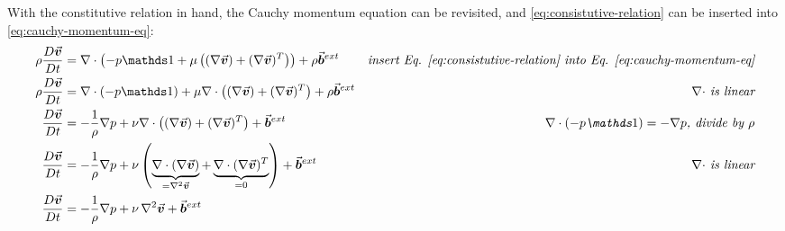 With the constitutive relation in hand, the Cauchy momentum equation can be revisited, and \autoref{eq:consistutive-relation} can be inserted into \autoref{eq:cauchy-momentum-eq}:
\begin{align}
    \label{eq:ns-deriv-step-1}\rho\frac{D\vek{v}}{Dt} & =  \nabla\cdot\left(-p\mat{1} + \mu\left((\nabla \vek{v}) + (\nabla \vek{v})^T\right)\right) + \rho\vek{b}^{ext}                                                         & \textit{insert Eq. \ref{eq:consistutive-relation} into Eq. \ref{eq:cauchy-momentum-eq}} \\
    \label{eq:ns-deriv-step-2}\rho\frac{D\vek{v}}{Dt} & = \nabla\cdot (-p\mat{1}) + \mu\nabla\cdot\left((\nabla \vek{v}) + (\nabla \vek{v})^T\right)+\rho\vek{b}^{ext}                                                           & \textit{$\nabla\cdot$ is linear}                                                        \\
    \label{eq:ns-deriv-step-3}\frac{D\vek{v}}{Dt}     & = -\frac{1}{\rho}\nabla p + \nu\nabla\cdot\left((\nabla \vek{v}) + (\nabla \vek{v})^T\right)+\vek{b}^{ext}                                                               & \textit{$\nabla\cdot (-p\mat{1}) = -\nabla p$, divide by $\rho$}                        \\
    \label{eq:ns-deriv-step-4}\frac{D\vek{v}}{Dt}     & = -\frac{1}{\rho}\nabla p + \nu\left(\underbrace{\nabla\cdot(\nabla \vek{v})}_{=\Laplace\vek{v}} + \underbrace{\nabla\cdot(\nabla \vek{v})^T}_{=0} \right)+\vek{b}^{ext} & \textit{$\nabla\cdot$ is linear}                                                        \\
    \label{eq:ns-deriv-step-5}\frac{D\vek{v}}{Dt}     & = -\frac{1}{\rho}\nabla p + \nu\Laplace\vek{v}+\vek{b}^{ext}                                                                                                             &
\end{align}

